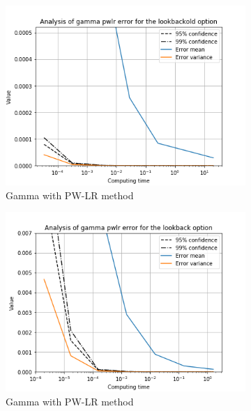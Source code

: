 \documentclass[11pt,a4paper,fleqn]{article}
\begin{document}
\begin{figure}[h!]
      \begin{subfigure}[b]{0.3\textwidth}
          \includegraphics[width=\textwidth]{graphs/lookbackoldgammapwlrtime.png}
          \caption{Gamma with PW-LR method}
      \end{subfigure}
      \begin{subfigure}[b]{0.3\textwidth}
          \includegraphics[width=\textwidth]{graphs/lookbackgammapwlrtime.png}
          \caption{Gamma with PW-LR method}
      \end{subfigure}
      \begin{subfigure}[b]{0.3\textwidth}

\end{subfigure}
\end{figure}
\end{document}
